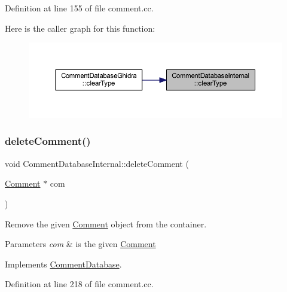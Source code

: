 Definition at line 155 of file comment.\+cc.

Here is the caller graph for this function\+:
\nopagebreak
\begin{figure}[H]
\begin{center}
\leavevmode
\includegraphics[width=350pt]{class_comment_database_internal_a5ab44b5d53ca52aef756c9ad476e2b34_icgraph}
\end{center}
\end{figure}
\mbox{\label{class_comment_database_internal_a623dac65760a7c7a328c652f34ee714a}} 
\subsubsection{\texorpdfstring{deleteComment()}{deleteComment()}}
{\footnotesize\ttfamily void Comment\+Database\+Internal\+::delete\+Comment (\begin{DoxyParamCaption}\item[{\mbox{\hyperlink{class_comment}{Comment}} $\ast$}]{com }\end{DoxyParamCaption})\hspace{0.3cm}{\ttfamily [virtual]}}



Remove the given \mbox{\hyperlink{class_comment}{Comment}} object from the container. 


\begin{DoxyParams}{Parameters}
{\em com} & is the given \mbox{\hyperlink{class_comment}{Comment}} \\
\hline
\end{DoxyParams}


Implements \mbox{\hyperlink{class_comment_database_ac41202723e47b57dd4996d484629d019}{Comment\+Database}}.



Definition at line 218 of file comment.\+cc.

\mbox{\label{class_comment_database_internal_a67ef8bcfd5778dd45acfd533ffd56189}} 

